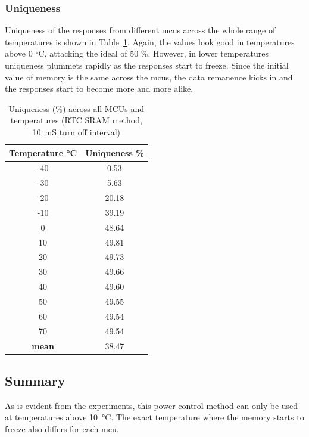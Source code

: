 \subsubsection*{Uniqueness}

Uniqueness of the responses from different \glspl{mcu} across the whole range of temperatures is shown in Table~\ref{table:uniqueness_rtc_sram}. Again, the values look good in temperatures above 0 °C, attacking the ideal of 50 \%. However, in lower temperatures uniqueness plummets rapidly as the responses start to freeze. Since the initial value of memory is the same across the \glspl{mcu}, the data remanence kicks in and the responses start to become more and more alike.

\begin{table}[ht!]
    \centering
    \begin{tabular}{cc}
    \textbf{Temperature °C} & \textbf{Uniqueness \%} \\
    \toprule
    -40  &  0.53 \\
    -30  &  5.63 \\
    -20  & 20.18 \\
    -10  & 39.19 \\
    0    & 48.64 \\
    10   & 49.81 \\
    20   & 49.73 \\
    30   & 49.66 \\
    40   & 49.60 \\
    50   & 49.55 \\
    60   & 49.54 \\
    70   & 49.54 \\
    \textbf{mean} & 38.47 \\
    \bottomrule
    \end{tabular}
    \captionsetup{justification=centering,margin=0.5cm}
    \caption{Uniqueness (\%) across all MCUs and temperatures (RTC SRAM method, 10~mS turn off interval)}
    \label{table:uniqueness_rtc_sram}
\end{table}

\subsection{Summary}
As is evident from the experiments, this power control method can only be used at temperatures above 10~°C. The exact temperature where the memory starts to freeze also differs for each \gls{mcu}.

